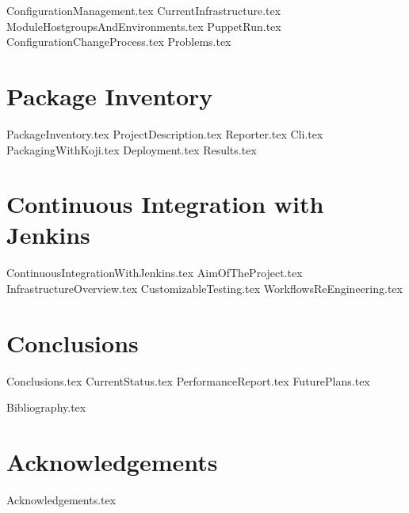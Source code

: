 \documentclass[12pt,a4paper,openright]{report}
\begin{document}
{ConfigurationManagement.tex}
{CurrentInfrastructure.tex}
{ModuleHostgroupsAndEnvironments.tex}
{PuppetRun.tex}
{ConfigurationChangeProcess.tex}
{Problems.tex}

\chapter{Package Inventory}

{PackageInventory.tex}
{ProjectDescription.tex}
{Reporter.tex}
{Cli.tex}
{PackagingWithKoji.tex}
{Deployment.tex}
{Results.tex}

\chapter{Continuous Integration with Jenkins}

{ContinuousIntegrationWithJenkins.tex}
{AimOfTheProject.tex}
{InfrastructureOverview.tex}
{CustomizableTesting.tex}
{WorkflowsReEngineering.tex}

\chapter{Conclusions}

{Conclusions.tex}
{CurrentStatus.tex}
{PerformanceReport.tex}
{FuturePlans.tex}


{Bibliography.tex}

\clearpage{\pagestyle{empty}\cleardoublepage}

\chapter*{Acknowledgements}

{Acknowledgements.tex}
\end{document}
